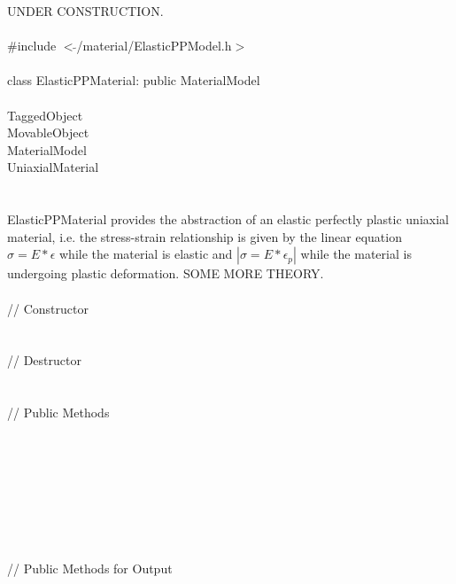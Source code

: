 
UNDER CONSTRUCTION. \\

   \\
\indent \#include $<\tilde{ }$/material/ElasticPPModel.h$>$  \\

  \\
\indent class ElasticPPMaterial: public MaterialModel \\

 \\
\indent TaggedObject \\
\indent MovableObject \\
\indent\indent MaterialModel \\
\indent\indent\indent UniaxialMaterial \\
\indent\indent\indent{} \\

  \\
\indent ElasticPPMaterial provides the abstraction of an elastic
perfectly plastic uniaxial material, i.e. the stress-strain
relationship is given by the linear equation $\sigma = E * \epsilon$
while the material is elastic and $| \sigma = E * \epsilon_p |$  while
the material is undergoing plastic deformation. SOME MORE THEORY. \\

 \\
\indent // Constructor \\
  \\ \\
\indent // Destructor \\
\\ \\
\indent // Public Methods \\
 \\
 \\
 \\
 \\
 \\
 \\
 \\ \\
\indent // Public Methods for Output\\
\\
\\
 \\

